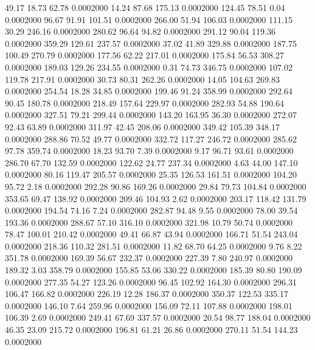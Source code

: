   49.17   18.73   62.78   0.0002000
  14.24   87.68  175.13   0.0002000
 124.45   78.51    0.04   0.0002000
  96.67   91.91  101.51   0.0002000
 266.00   51.94  106.03   0.0002000
 111.15   30.29  246.16   0.0002000
 280.62   96.64   94.82   0.0002000
 291.12   90.04  119.36   0.0002000
 359.29  129.61  237.57   0.0002000
  37.02   41.89  329.88   0.0002000
 187.75  100.49  270.79   0.0002000
 177.56   62.22  217.01   0.0002000
 175.84   56.53  308.27   0.0002000
 189.03  129.26  234.55   0.0002000
   0.31   74.73  346.75   0.0002000
 107.02  119.78  217.91   0.0002000
  30.73   80.31  262.26   0.0002000
  14.05  104.63  269.83   0.0002000
 254.54   18.28   34.85   0.0002000
 199.46   91.24  358.99   0.0002000
 292.64   90.45  180.78   0.0002000
 218.49  157.64  229.97   0.0002000
 282.93   54.88  190.64   0.0002000
 327.51   79.21  299.44   0.0002000
 143.20  163.95   36.30   0.0002000
 272.07   92.43   63.89   0.0002000
 311.97   42.45  208.06   0.0002000
 349.42  105.39  348.17   0.0002000
 288.86   70.52   49.77   0.0002000
 332.72  117.27  246.72   0.0002000
 285.62   97.78  359.74   0.0002000
  18.23   93.70    7.39   0.0002000
   9.17   96.71   93.61   0.0002000
 286.70   67.70  132.59   0.0002000
 122.62   24.77  237.34   0.0002000
   4.63   44.00  147.10   0.0002000
  80.16  119.47  205.57   0.0002000
  25.35  126.53  161.51   0.0002000
 104.20   95.72    2.18   0.0002000
 292.28   90.86  169.26   0.0002000
  29.84   79.73  104.84   0.0002000
 353.65   69.47  138.92   0.0002000
 209.46  104.93    2.62   0.0002000
 203.17  118.42  131.79   0.0002000
 194.54   74.16    7.24   0.0002000
 282.87   94.48    9.55   0.0002000
  78.00   39.54  193.36   0.0002000
 288.67   57.10  316.10   0.0002000
 321.98   10.79   50.74   0.0002000
  78.47  100.01  210.42   0.0002000
  49.41   66.87   43.94   0.0002000
 166.71   51.54  243.04   0.0002000
 218.36  110.32  281.51   0.0002000
  11.82   68.70   64.25   0.0002000
   9.76    8.22  351.78   0.0002000
 169.39   56.67  232.37   0.0002000
 227.39    7.80  240.97   0.0002000
 189.32    3.03  358.79   0.0002000
 155.85   53.06  330.22   0.0002000
 185.39   80.80  190.09   0.0002000
 277.35   54.27  123.26   0.0002000
  96.45  102.92  164.30   0.0002000
 296.31  106.47  166.82   0.0002000
 226.19   12.28  186.37   0.0002000
 350.37  122.53  335.17   0.0002000
 146.10    7.64  259.96   0.0002000
 156.09   72.11  107.88   0.0002000
 198.01  106.39    2.69   0.0002000
 249.41   67.69  337.57   0.0002000
  20.54   98.77  188.04   0.0002000
  46.35   23.09  215.72   0.0002000
 196.81   61.21   26.86   0.0002000
 270.11   51.54  144.23   0.0002000
